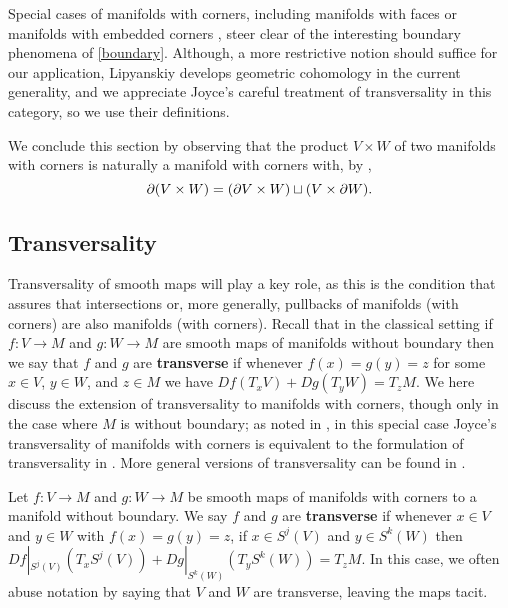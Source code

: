 \begin{comment}
\end{comment}

Special cases of manifolds with corners, including
manifolds with faces or manifolds with embedded corners \cite{Joy12}, steer clear of the interesting boundary phenomena of \cref{boundary}.
Although, a more restrictive notion should suffice for our application, Lipyanskiy develops geometric cohomology in the current generality, and we appreciate Joyce's careful treatment of transversality in this category, so we use their definitions.

We conclude this section by observing that the product $V \times W$ of two manifolds with corners is naturally a manifold with corners with, by \cite[Proposition 2.12]{Joy12},
$$\partial (V \times W) = (\partial V \times W) \sqcup (V \times \partial W).$$

\subsection{Transversality}

Transversality of smooth maps will play a key role, as this is the condition that assures that intersections or, more generally, pullbacks of manifolds (with corners) are also manifolds (with corners).
Recall that in the classical setting if $f \colon V \to M$ and $g \colon W \to M$ are smooth maps of manifolds without boundary then we say that $f$ and $g$ are \textbf{transverse} if whenever $f(x) = g(y) = z$ for some $x \in V$, $y \in W$, and $z \in M$ we have $Df(T_xV)+Dg(T_yW) = T_z M$.
We here discuss the extension of transversality to manifolds with corners, though only in the case where $M$ is without boundary; as noted in \cite[Remark 6.3]{Joy12}, in this special case Joyce's transversality of manifolds with corners is equivalent to the formulation of transversality in \cite[Section 7.2]{MaDo92}.
More general versions of transversality can be found in \cite[Section 6]{Joy12}.

\begin{definition}{\cite[Special case of Definition 6.1]{Joy12}}
	Let $f \colon V \to M$ and $g \colon W \to M$ be smooth maps of manifolds with corners to a manifold without boundary.
	We say $f$ and $g$ are \textbf{transverse} if whenever $x \in V$ and $y\in W$ with $f(x) = g(y) = z$, if  $x\in S^j(V)$ and $y \in S^k(W)$  then $Df|_{S^j(V)}(T_xS^j(V))+Dg|_{S^k(W)}(T_yS^k(W)) = T_zM$.
	In this case, we often abuse notation by saying that $V$ and $W$ are transverse, leaving the maps tacit.
\end{definition}

